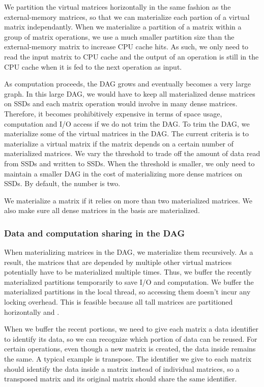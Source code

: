 We partition the virtual matrices horizontally in the same fashion as
the external-memory matrices, so that we can materialize each partion of
a virtual matrix independantly. 
When we materialize a partition of a matrix within a group of matrix
operations, we use a much smaller partition size than the external-memory
matrix to increase CPU cache hits. As such, we only need to read the input
matrix to CPU cache and the output of an operation is still in the CPU cache
when it is fed to the next operation as input.

As computation proceeds, the DAG grows and eventually becomes a very large graph.
In this large DAG, we would have to keep all materialized dense matrices on SSDs
and each matrix operation would involve in many dense matrices. Therefore, it
becomes prohibitively expensive in terms of space usage, computation and I/O
access if we do not trim the DAG. To trim the DAG, we materialize some of
the virtual matrices in the DAG. The current criteria is to materialize a virtual
matrix if the matrix depends on a certain number of materialized matrices.
We vary the threshold to trade off the amount of data read from SSDs and written
to SSDs. When the threshold is smaller, we only need to maintain a smaller DAG
in the cost of materializing more dense matrices on SSDs. By default, the number
is two. 

We materialize a matrix if it relies on more than two materialized matrices.
We also make sure all dense matrices in the basis are materialized.

\subsubsection{Data and computation sharing in the DAG}
When materializing matrices in the DAG, we materialize them recursively.
As a result, the matrices that are depended by multiple other virtual matrices
potentially have to be materialized multiple times. Thus, we buffer the
recently materialized partitions temporarily to save I/O and computation.
We buffer the materialized partitions in the local thread, so accessing them
doesn't incur any locking overhead.
This is feasible because all tall matrices are partitioned horizontally and .


When we buffer the recent portions, we need to give each matrix a data identifier
to identify its data, so we can recognize which portion of data can be reused.
For certain operations, even though a new matrix is created, the data inside
remains the same. A typical example is transpose. The identifier we give to
each matrix should identify the data inside a matrix instead of individual matrices,
so a transposed matrix and its original matrix should share the same identifier.

